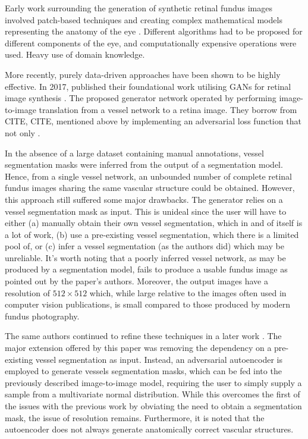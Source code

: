 Early work surrounding the generation of synthetic retinal fundus images involved patch-based techniques and creating complex mathematical models representing the anatomy of the eye \cite{BONALDI201654, N20103:2014}. Different algorithms had to be proposed for different components of the eye, and computationally expensive operations were used. Heavy use of domain knowledge.

More recently, purely data-driven approaches have been shown to be highly effective. In 2017, \citeauthor{DBLP:journals/corr/CostaGMANMC17} published their foundational work utilising GANs for retinal image synthesis \cite{DBLP:journals/corr/CostaGMANMC17}. The proposed generator network operated by performing image-to-image translation from a vessel network to a retina image. They borrow from CITE, CITE, mentioned above by implementing an adversarial loss function that not only . 

In the absence of a large dataset containing manual annotations, vessel segmentation masks were inferred from the output of a segmentation model. Hence, from a single vessel network, an unbounded number of complete retinal fundus images sharing the same vascular structure could be obtained. However, this approach still suffered some major drawbacks. The generator relies on a vessel segmentation mask as input. This is unideal since the user will have to either (a) manually obtain their own vessel segmentation, which in and of itself is a lot of work, (b) use a pre-existing vessel segmentation, which there is a limited pool of, or (c) infer a vessel segmentation (as the authors did) which may be unreliable. It's worth noting that a poorly inferred vessel network, as may be produced by a segmentation model, fails to produce a usable fundus image as pointed out by the paper's authors. Moreover, the output images have a resolution of $512 \times 512$ which, while large relative to the images often used in computer vision publications, is small compared to those produced by modern fundus photography.

The same authors continued to refine these techniques in a later work \cite{8055572}. The major extension offered by this paper was removing the dependency on a pre-existing vessel segmentation as input. Instead, an adversarial autoencoder is employed to generate vessels segmentation masks, which can be fed into the previously described image-to-image model, requiring the user to simply supply a sample from a multivariate normal distribution. While this overcomes the first of the issues with the previous work by obviating the need to obtain a segmentation mask, the issue of resolution remains. Furthermore, it is noted that the autoencoder does not always generate anatomically correct vascular structures.


